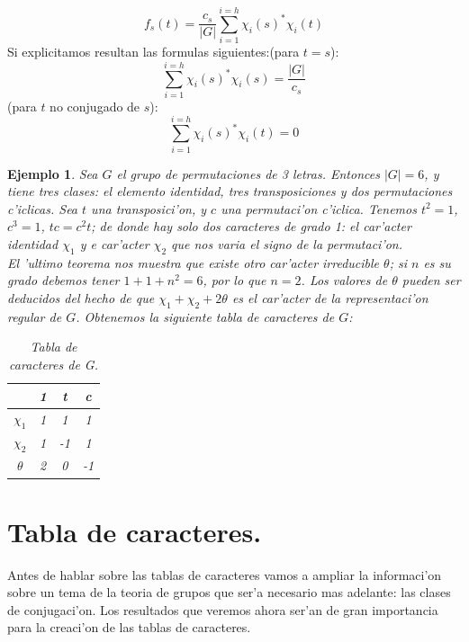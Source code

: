 \documentclass[a4paper,openright,12pt]{book}
\numberwithin{equation}{section} %
\newtheorem{ejemplo}{Ejemplo}[section] %
\begin{document}
\[
f_{s}(t)=\frac{c_{s}}{|G|}\sum_{i=1}^{i=h}\chi_{i}(s)^{*}\chi_{i}(t)
\]
Si explicitamos resultan las formulas siguientes:(para $t=s$):
\[
\sum_{i=1}^{i=h}\chi_{i}(s)^{*}\chi_{i}(s)=\frac{|G|}{c_{s}}
\]
(para $t$ no conjugado de $s$):
\[
\sum_{i=1}^{i=h}\chi_{i}(s)^{*}\chi_{i}(t)=0
\]
\begin{ejemplo}
Sea $G$ el grupo de permutaciones de 3 letras. Entonces $|G|=6$, y tiene tres clases: el elemento identidad, tres transposiciones y dos permutaciones c'iclicas. Sea $t$ una transposici'on, y $c$ una permutaci'on c'iclica. Tenemos $t^{2}=1$, $c^{3}=1$, $tc=c^{2}t$; de donde hay solo dos caracteres de grado 1: el car'acter identidad $\chi_{1}$ y e car'acter $\chi_{2}$ que nos varia el signo de la permutaci'on.\\
El 'ultimo teorema nos muestra que existe otro car'acter irreducible $\theta$; si $n$ es su grado debemos tener $1+1+n^{2}=6$, por lo que $n=2$. Los valores de $\theta$ pueden ser deducidos del hecho de que $\chi_{1}+\chi_{2}+2\theta$ es el car'acter de la representaci'on regular de $G$. Obtenemos la siguiente tabla de caracteres de $G$:
\begin{table}[H]
\begin{center}
\begin{tabular}{|c|c|c|c|}
\hline
& 1 & t & c \\
\hline \hline
$\chi_{1}$ & 1 & 1 & 1 \\ 
$\chi_{2}$ & 1 & -1 & 1 \\ 
$\theta$ & 2 & 0 & -1 \\ 
\hline
\end{tabular}
\caption{Tabla de caracteres de G.}
\label{tabla:caracteresG}
\end{center}
\end{table}
\end{ejemplo}
\chapter{Tabla de caracteres.}
Antes de hablar sobre las tablas de caracteres vamos a ampliar la informaci'on sobre un tema de la teoria de grupos que ser'a necesario mas adelante: las clases de conjugaci'on. Los resultados que veremos ahora ser'an de gran importancia para la creaci'on de las tablas de caracteres.
\end{document}
